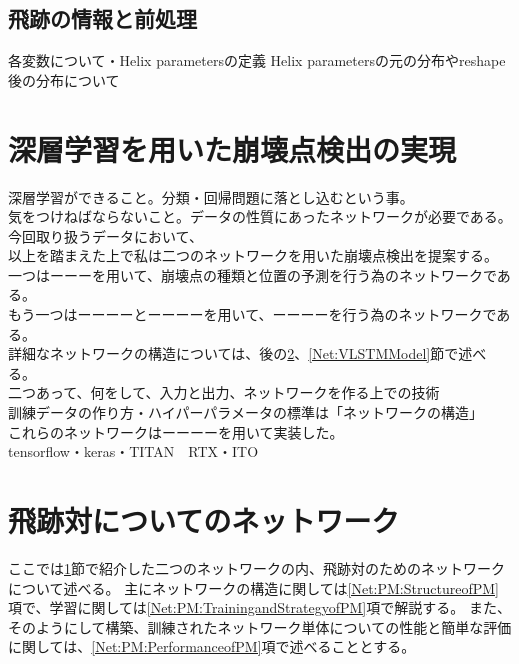 \subsection{飛跡の情報と前処理} \label{Net:Data:TrackInformationandPreprocessing}

各変数について・Helix parametersの定義\cite{TrackParametersLCIO}
Helix parametersの元の分布やreshape後の分布について\\

\section{深層学習を用いた崩壊点検出の実現} \label{Net:forVertexFinderwithDL}

深層学習ができること。分類・回帰問題に落とし込むという事。\\
気をつけねばならないこと。データの性質にあったネットワークが必要である。今回取り扱うデータにおいて、\\

以上を踏まえた上で私は二つのネットワークを用いた崩壊点検出を提案する。\\
一つはーーーを用いて、崩壊点の種類と位置の予測を行う為のネットワークである。\\
もう一つはーーーーとーーーーを用いて、ーーーーを行う為のネットワークである。\\
詳細なネットワークの構造については、後の\ref{Net:PairModel}、\ref{Net:VLSTMModel}節で述べる。\\
二つあって、何をして、入力と出力、ネットワークを作る上での技術\\
訓練データの作り方・ハイパーパラメータの標準は「ネットワークの構造」\\

これらのネットワークはーーーーを用いて実装した。\\
tensorflow・keras・TITAN　RTX・ITO\\


\section{飛跡対についてのネットワーク} \label{Net:PairModel}

ここでは\ref{Net:forVertexFinderwithDL}節で紹介した二つのネットワークの内、飛跡対のためのネットワークについて述べる。
主にネットワークの構造に関しては\ref{Net:PM:StructureofPM}項で、学習に関しては\ref{Net:PM:TrainingandStrategyofPM}項で解説する。
また、そのようにして構築、訓練されたネットワーク単体についての性能と簡単な評価に関しては、\ref{Net:PM:PerformanceofPM}項で述べることとする。

